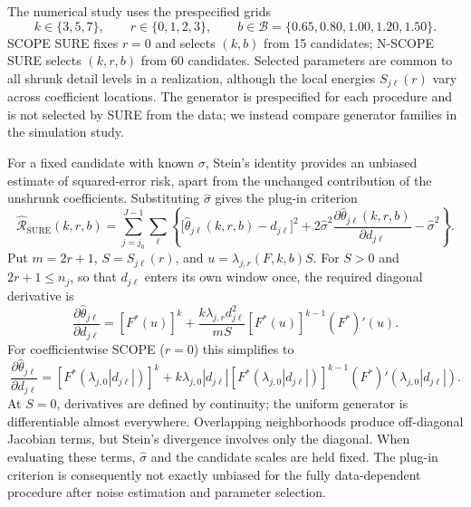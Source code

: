 \documentclass[12pt]{article}
\theoremstyle{definition}
\theoremstyle{definition}
\begin{document}
The numerical study uses the prespecified grids
\begin{equation}
k\in\{3,5,7\},\qquad r\in\{0,1,2,3\},\qquad
b\in\mathcal B=\{0.65,0.80,1.00,1.20,1.50\}.
\label{eq:simul-sure-grids}
\end{equation}
SCOPE SURE fixes $r=0$ and selects $(k,b)$ from 15 candidates;
N-SCOPE SURE selects $(k,r,b)$ from 60 candidates. Selected parameters
are common to all shrunk detail levels in a realization, although
the local energies $S_{j\ell}(r)$ vary across coefficient locations.
The generator is prespecified for each procedure and is not selected
by SURE from the data; we instead compare generator families in the
simulation study.

For a fixed candidate with known $\sigma$, Stein's identity provides
an unbiased estimate of squared-error risk, apart from the unchanged
contribution of the unshrunk coefficients. Substituting
$\widehat\sigma$ gives the plug-in criterion
\begin{equation}
\widehat{\mathcal R}_{\mathrm{SURE}}(k,r,b)
 = \sum_{j=j_0}^{J-1}\sum_{\ell}
 \left\{\bigl[\widehat\theta_{j\ell}(k,r,b)-d_{j\ell}\bigr]^2
 +2\widehat\sigma^2
 \frac{\partial\widehat\theta_{j\ell}(k,r,b)}{\partial d_{j\ell}}
 -\widehat\sigma^2\right\}.
\label{eq:simul-nscope-sure}
\end{equation}
Put $m=2r+1$, $S=S_{j\ell}(r)$, and $u=\lambda_{j,r}(F,k,b)S$. For $S>0$
and $2r+1\le n_j$, so that $d_{j\ell}$ enters its own window once,
the required diagonal derivative is
\begin{equation}
\frac{\partial\widehat\theta_{j\ell}}{\partial d_{j\ell}}
 = [F^*(u)]^k
 +\frac{k\lambda_{j,r}d_{j\ell}^{2}}{mS}
  [F^*(u)]^{k-1}(F^*)'(u).
\label{eq:simul-nscope-divergence}
\end{equation}
For coefficientwise SCOPE ($r=0$) this simplifies to
\begin{equation}
\frac{\partial\widehat\theta_{j\ell}}{\partial d_{j\ell}}
 = [F^*(\lambda_{j,0}|d_{j\ell}|)]^k
 +k\lambda_{j,0}|d_{j\ell}|
  [F^*(\lambda_{j,0}|d_{j\ell}|)]^{k-1}
  (F^*)'(\lambda_{j,0}|d_{j\ell}|).
\label{eq:cal-scope-divergence}
\end{equation}
At $S=0$, derivatives are defined by continuity; the uniform
generator is differentiable almost everywhere. Overlapping
neighborhoods produce off-diagonal Jacobian terms, but Stein's
divergence involves only the diagonal. When evaluating these terms,
$\widehat\sigma$ and the candidate scales are held fixed. The
plug-in criterion is consequently not exactly unbiased for the
fully data-dependent procedure after noise estimation and parameter
selection.
\end{document}

